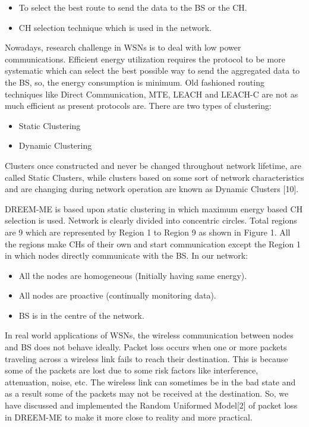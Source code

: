 \documentclass[journal]{IEEEtran}
\begin{document}
\begin{itemize}
  \item To select the best route to send the data to the BS or the CH.
  \item CH selection technique which is used in the network.
\end{itemize}

Nowadays, research challenge in WSNs is to deal with low power communications. Efficient energy utilization requires the protocol to be more systematic which can select the best possible way to send the aggregated data to the BS, so, the energy consumption is minimum. Old fashioned routing techniques like Direct Communication, MTE, LEACH and LEACH-C are not as much efficient as present protocols are. There are two types of clustering:
\begin{itemize}
  \item Static Clustering
  \item Dynamic Clustering
\end{itemize}
 Clusters once constructed and never be changed throughout network lifetime, are called Static Clusters, while clusters based on some sort of network characteristics and are changing during network operation are known as Dynamic Clusters [10].

DREEM-ME is based upon static clustering in which maximum energy based CH selection is used. Network is clearly divided into concentric circles. Total regions are 9 which are represented by Region 1 to Region 9 as shown in Figure 1. All the regions make CHs of their own and start communication except the Region 1 in which nodes directly communicate with the BS. In our network:
\begin{itemize}
  \item All the nodes are homogeneous (Initially having same energy).
  \item All nodes are proactive (continually monitoring data).
  \item BS is in the centre of the network.
\end{itemize}
In real world applications of WSNs, the wireless communication between nodes and BS does not behave ideally. Packet loss occurs when one or more packets traveling across a wireless link fails to reach their destination. This is because some of the packets are lost due to some risk factors like interference, attenuation, noise, etc. The wireless link can sometimes be in the bad state and as a result some of the packets may not be received at the destination. So, we have discussed and implemented the Random Uniformed Model[2] of packet loss in DREEM-ME to make it more close to reality and more practical.
\end{document}
